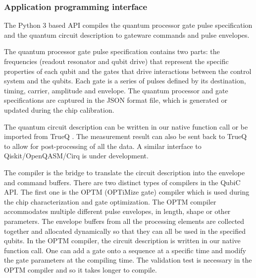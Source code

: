 \documentclass{ieeetran}
\begin{document}
\subsubsection{Application programming interface}
The Python 3 based API compiles the quantum processor gate pulse specification and the quantum circuit description to gateware commands and pulse envelopes.

The quantum processor gate pulse specification contains two parts: the frequencies (readout resonator and qubit drive) that represent the specific properties of each qubit and the gates that drive interactions between the control system and the qubits. 
Each gate is a series of pulses defined by its destination, timing, carrier, amplitude and envelope.
The quantum processor and gate specifications are captured in the JSON format file, which is generated or updated during the chip calibration.

The quantum circuit description can be written in our native function call or be imported from TrueQ \cite{trueq2020}. 
The measurement result can also be sent back to TrueQ to allow for post-processing of all the data. 
A similar interface to Qiskit/OpenQASM/Cirq \cite{qiskit2020,cross2017open,cirq2020} is under development.

The compiler is the bridge to translate the circuit description into the envelope and command buffers.
There are two distinct types of compilers in the QubiC API. 
The first one is the OPTM (OPTiMize gate) compiler which is used during the chip characterization and gate optimization.
The OPTM compiler accommodates multiple different pulse envelopes, in length, shape or other parameters.
The envelope buffers from all the processing elements are collected together and allocated dynamically so that they can all be used in the specified qubits. 
In the OPTM compiler, the circuit description is written in our native function call.
One can add a gate onto a sequence at a specific time and modify the gate parameters at the compiling time.
The validation test is necessary in the OPTM compiler and so it takes longer to compile.
\end{document}
